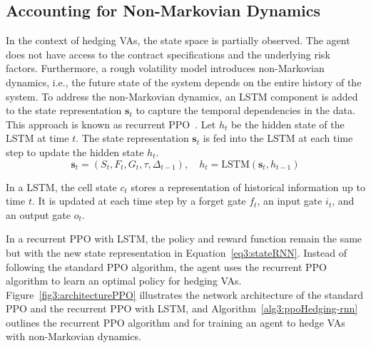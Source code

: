 \subsection{Accounting for Non-Markovian Dynamics}

In the context of hedging VAs, the state space is partially observed.
The agent does not have access to the contract specifications and the underlying risk factors.
Furthermore, a rough volatility model introduces non-Markovian dynamics, i.e., the future state of the system depends on the entire history of the system.
To address the non-Markovian dynamics, an LSTM component is added to the state representation $\mathbf{s}_t$ to capture the temporal dependencies in the data.
This approach is known as recurrent PPO~\citep{ni2021recurrent}.
Let $h_t$ be the hidden state of the LSTM at time $t$.
The state representation $\mathbf{s}_t$ is fed into the LSTM at each time step to update the hidden state $h_t$.
\begin{equation} \label{eq3:stateRNN}
    \mathbf{s}_t = (S_t, F_t, G_t, \tau, \Delta_{t-1}), \quad h_t = \text{LSTM}(\mathbf{s}_t, h_{t-1})
\end{equation}

In a LSTM, the cell state $c_t$ stores a representation of historical information up to time $t$.
It is updated at each time step by a forget gate $f_t$, an input gate $i_t$, and an output gate $o_t$.

In a recurrent PPO with LSTM, the policy and reward function remain the same but with the new state representation in Equation~\ref{eq3:stateRNN}.
Instead of following the standard PPO algorithm, the agent uses the recurrent PPO algorithm to learn an optimal policy for hedging VAs.
Figure~\ref{fig3:architecturePPO} illustrates the network architecture of the standard PPO and the recurrent PPO with LSTM, and Algorithm~\ref{alg3:ppoHedging-rnn} outlines the recurrent PPO algorithm and for training an agent to hedge VAs with non-Markovian dynamics.


